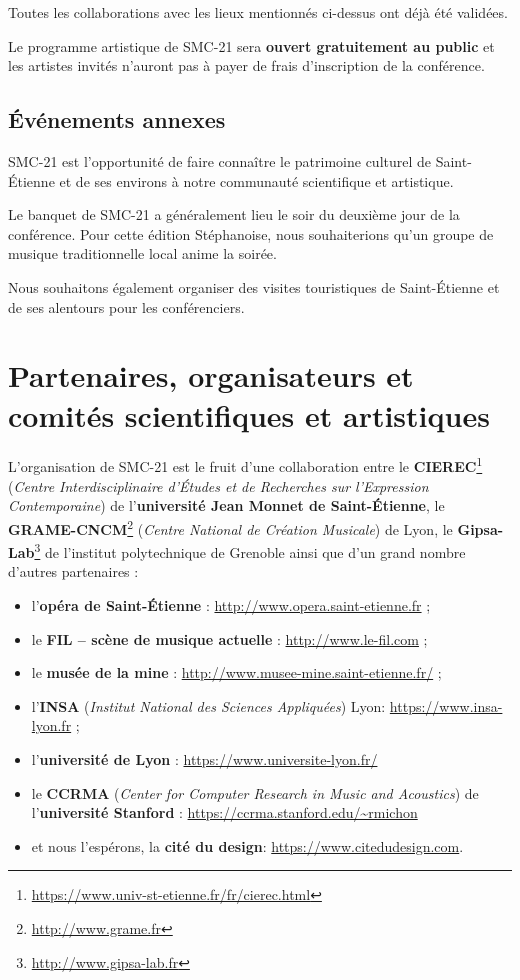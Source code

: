 \documentclass[fontsize=12pt]{scrartcl} %
\numberwithin{equation}{section} %
\numberwithin{figure}{section} %
\numberwithin{table}{section} %
\begin{document}
Toutes les collaborations avec les lieux mentionnés ci-dessus ont déjà été validées.

Le programme artistique de SMC-21 sera \textbf{ouvert gratuitement au public} et les artistes invités n'auront pas à payer de frais d'inscription de la conférence.

\subsection{Événements annexes}

SMC-21 est l'opportunité de faire connaître le patrimoine culturel de Saint-Étienne et de ses environs à notre communauté scientifique et artistique. 

Le banquet de SMC-21 a généralement lieu le soir du deuxième jour de la conférence. Pour cette édition Stéphanoise, nous souhaiterions qu'un groupe de musique traditionnelle local anime la soirée.

Nous souhaitons également organiser des visites touristiques de Saint-Étienne et de ses alentours pour les conférenciers.

\section{Partenaires, organisateurs et comités scientifiques et artistiques}

L'organisation de SMC-21 est le fruit d'une collaboration entre le \textbf{CIEREC}\footnote{\url{https://www.univ-st-etienne.fr/fr/cierec.html}} (\textit{Centre Interdisciplinaire d'Études et de Recherches sur l'Expression Contemporaine}) de l'\textbf{université Jean Monnet de Saint-Étienne}, le \textbf{GRAME-CNCM}\footnote{\url{http://www.grame.fr}} (\textit{Centre National de Création Musicale}) de Lyon, le \textbf{Gipsa-Lab}\footnote{\url{http://www.gipsa-lab.fr}} de l'institut polytechnique de Grenoble ainsi que d'un grand nombre d'autres partenaires :

\begin{itemize}
\item l'\textbf{opéra de Saint-Étienne} : \url{http://www.opera.saint-etienne.fr} ;
\item le \textbf{FIL -- scène de musique actuelle} : \url{http://www.le-fil.com} ;
\item le \textbf{musée de la mine} : \url{http://www.musee-mine.saint-etienne.fr/} ;
\item l'\textbf{INSA} (\textit{Institut National des Sciences Appliquées}) Lyon: \url{https://www.insa-lyon.fr} ;
\item l'\textbf{université de Lyon} : \url{https://www.universite-lyon.fr/}
\item le \textbf{CCRMA} (\textit{Center for Computer Research in Music and Acoustics}) de l'\textbf{université Stanford} : \url{https://ccrma.stanford.edu/~rmichon}
\item et nous l'espérons, la \textbf{cité du design}: \url{https://www.citedudesign.com}.
\end{itemize}
\end{document}
